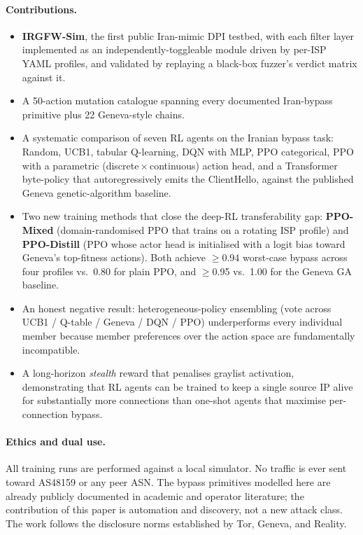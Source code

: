 \documentclass[letterpaper,twocolumn,10pt]{article}
\begin{document}
\paragraph{Contributions.}
\begin{itemize}
    \item \textbf{IRGFW-Sim}, the first public Iran-mimic DPI testbed, with
    each filter layer implemented as an independently-toggleable module
    driven by per-ISP YAML profiles, and validated by replaying a
    black-box fuzzer's verdict matrix against it.
    \item A 50-action mutation catalogue spanning every documented
    Iran-bypass primitive plus 22 Geneva-style chains.
    \item A systematic comparison of seven RL agents on the Iranian
    bypass task: Random, UCB1, tabular Q-learning, DQN with MLP, PPO
    categorical, PPO with a parametric (discrete\,$\times$\,continuous)
    action head, and a Transformer byte-policy that autoregressively
    emits the ClientHello, against the published Geneva genetic-algorithm
    baseline.
    \item Two new training methods that close the deep-RL transferability
    gap: \textbf{PPO-Mixed} (domain-randomised PPO that trains on a
    rotating ISP profile) and \textbf{PPO-Distill} (PPO whose actor head
    is initialised with a logit bias toward Geneva's top-fitness
    actions). Both achieve $\geq$0.94 worst-case bypass across four
    profiles vs.\ 0.80 for plain PPO, and $\geq$0.95 vs.\ 1.00 for the
    Geneva GA baseline.
    \item An honest negative result: heterogeneous-policy ensembling
    (vote across UCB1 / Q-table / Geneva / DQN / PPO) underperforms
    every individual member because member preferences over the action
    space are fundamentally incompatible.
    \item A long-horizon \emph{stealth} reward that penalises graylist
    activation, demonstrating that RL agents can be trained to keep a
    single source IP alive for substantially more connections than
    one-shot agents that maximise per-connection bypass.
\end{itemize}

\paragraph{Ethics and dual use.} All training runs are performed against a
local simulator. No traffic is ever sent toward AS48159 or any peer ASN.
The bypass primitives modelled here are already publicly documented in
academic and operator literature; the contribution of this paper is
automation and discovery, not a new attack class. The work follows the
disclosure norms established by Tor, Geneva, and Reality.
\end{document}
